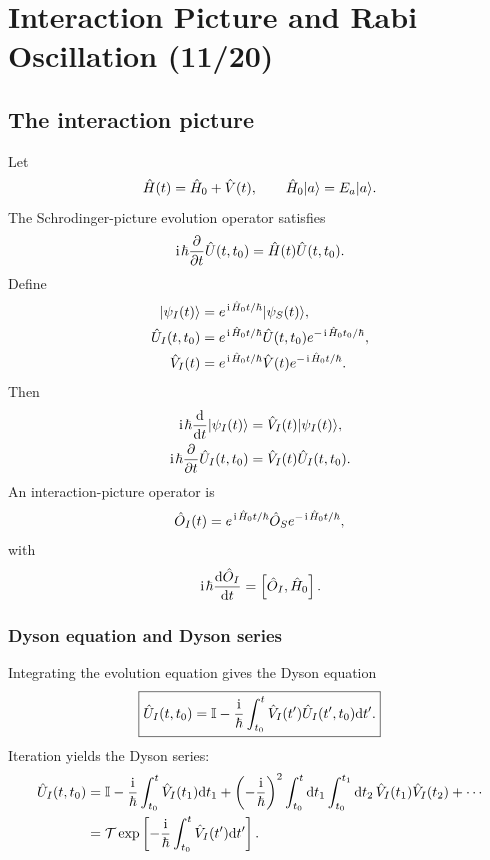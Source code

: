 \section{Interaction Picture and Rabi Oscillation (11/20)}


\subsection{The interaction picture}
Let
\begin{equation}
 \hat H(t)=\hat H_0+\hat V(t),
 \qquad
 \hat H_0|{a}\rangle=E_a|{a}\rangle.
\end{equation}
The Schrodinger-picture evolution operator satisfies
\begin{equation}
 \hspace{1pt}\mathrm{i}\hspace{1pt}\hbar\frac{\partial}{\partial t}\hat U(t,t_0)
 =\hat H(t)\hat U(t,t_0).
\end{equation}
Define
\begin{align}
 |{\psi_I(t)}\rangle
 &=e^{\hspace{1pt}\mathrm{i}\hspace{1pt}\hat H_0t/\hbar}|{\psi_S(t)}\rangle,\\
 \hat U_I(t,t_0)
 &=e^{\hspace{1pt}\mathrm{i}\hspace{1pt}\hat H_0t/\hbar}
 \hat U(t,t_0)e^{-\hspace{1pt}\mathrm{i}\hspace{1pt}\hat H_0t_0/\hbar},\\
 \hat V_I(t)
 &=e^{\hspace{1pt}\mathrm{i}\hspace{1pt}\hat H_0t/\hbar}
 \hat V(t)e^{-\hspace{1pt}\mathrm{i}\hspace{1pt}\hat H_0t/\hbar}.
\end{align}
Then
\begin{align}
 \hspace{1pt}\mathrm{i}\hspace{1pt}\hbar\frac{\mathrm{d}}{\mathrm{d} t}|{\psi_I(t)}\rangle
 &=\hat V_I(t)|{\psi_I(t)}\rangle,\\
 \hspace{1pt}\mathrm{i}\hspace{1pt}\hbar\frac{\partial}{\partial t}\hat U_I(t,t_0)
 &=\hat V_I(t)\hat U_I(t,t_0).
\end{align}
An interaction-picture operator is
\begin{equation}
 \hat O_I(t)=e^{\hspace{1pt}\mathrm{i}\hspace{1pt}\hat H_0t/\hbar}
 \hat O_Se^{-\hspace{1pt}\mathrm{i}\hspace{1pt}\hat H_0t/\hbar},
\end{equation}
with
\begin{equation}
 \hspace{1pt}\mathrm{i}\hspace{1pt}\hbar\frac{\mathrm{d}\hat O_I}{\mathrm{d} t}
 =\left[\hat O_I,\hat H_0\right].
\end{equation}

\subsubsection{Dyson equation and Dyson series}
Integrating the evolution equation gives the Dyson equation
\begin{equation}
 \boxed{
 \hat U_I(t,t_0)
 =\mathbb{I}-\frac{\hspace{1pt}\mathrm{i}\hspace{1pt}}{\hbar}
 \int_{t_0}^{t}\hat V_I(t')\hat U_I(t',t_0)\mathrm{d} t'.}
\end{equation}
Iteration yields the Dyson series:
\begin{align}
 \hat U_I(t,t_0)
 &=\mathbb{I}-\frac{\hspace{1pt}\mathrm{i}\hspace{1pt}}{\hbar}\int_{t_0}^{t}
 \hat V_I(t_1)\mathrm{d} t_1+
 \left(-\frac{\hspace{1pt}\mathrm{i}\hspace{1pt}}{\hbar}\right)^2
 \int_{t_0}^{t}\mathrm{d} t_1
 \int_{t_0}^{t_1}\mathrm{d} t_2\,
 \hat V_I(t_1)\hat V_I(t_2)+\cdots\\
 &=\mathcal T\exp\left[-\frac{\hspace{1pt}\mathrm{i}\hspace{1pt}}{\hbar}
 \int_{t_0}^{t}\hat V_I(t')\mathrm{d} t'\right].
\end{align}

